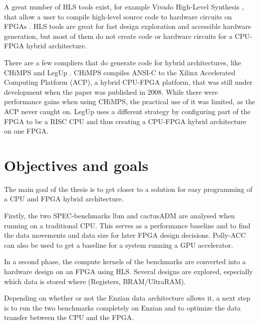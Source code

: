 \documentclass[12pt]{article}
\begin{document}
A great number of HLS tools exist, for example Vivado High-Level Synthesis \cite{Vivado_HLS}, that allow a user to compile high-level source code to hardware circuits on FPGAs \cite{HLS_overview}. HLS tools are great for fast design exploration and accessible hardware generation, but most of them do not create code or hardware circuits for a CPU-FPGA hybrid architecture.

There are a few compliers that do generate code for hybrid architectures, like CHiMPS \cite{CHiMPS} and LegUp \cite{LegUp}. CHiMPS compiles ANSI-C to the Xilinx Accelerated Computing Platform (ACP), a hybrid CPU-FPGA platform, that was still under development when the paper was published in 2008. While there were performance gains when using CHiMPS, the practical use of it was limited, as the ACP never caught on. LegUp uses a different strategy by configuring part of the FPGA to be a RISC CPU and thus creating a CPU-FPGA hybrid architecture on one FPGA.
\section*{Objectives and goals}
The main goal of the thesis is to get closer to a solution for easy programming of a CPU and FPGA hybrid architecture.

Firstly, the two SPEC-benchmarks lbm \cite{SPEC_lbm} and cactusADM \cite{SPEC_cactusADM} are analysed when running on a traditional CPU. This serves as a performance baseline and to find the data movements and data size for later FPGA design decisions. Polly-ACC can also be used to get a baseline for a system running a GPU accelerator.  

In a second phase, the compute kernels of the benchmarks are converted into a hardware design on an FPGA using HLS. Several designs are explored, especially which data is stored where (Registers, BRAM/UltraRAM).

Depending on whether or not the Enzian data architecture allows it, a next step is to run the two benchmarks completely on Enzian and to optimize the data transfer between the CPU and the FPGA.
\end{document}
